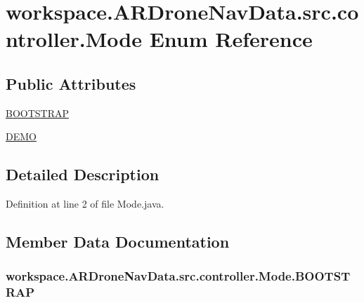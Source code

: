 \hypertarget{enumworkspace_1_1_a_r_drone_nav_data_1_1src_1_1controller_1_1_mode}{}\section{workspace.\+A\+R\+Drone\+Nav\+Data.\+src.\+controller.\+Mode Enum Reference}
\label{enumworkspace_1_1_a_r_drone_nav_data_1_1src_1_1controller_1_1_mode}
\subsection*{Public Attributes}
\begin{DoxyCompactItemize}
\item 
\hyperlink{enumworkspace_1_1_a_r_drone_nav_data_1_1src_1_1controller_1_1_mode_a2120c5fbe7850731f0921fa1523a0f67}{B\+O\+O\+T\+S\+T\+R\+A\+P}
\item 
\hyperlink{enumworkspace_1_1_a_r_drone_nav_data_1_1src_1_1controller_1_1_mode_a09071332c54725b55b8f88c41ec504d1}{D\+E\+M\+O}
\end{DoxyCompactItemize}


\subsection{Detailed Description}


Definition at line 2 of file Mode.\+java.



\subsection{Member Data Documentation}
\hypertarget{enumworkspace_1_1_a_r_drone_nav_data_1_1src_1_1controller_1_1_mode_a2120c5fbe7850731f0921fa1523a0f67}{}
\subsubsection[{B\+O\+O\+T\+S\+T\+R\+A\+P}]{\setlength{\rightskip}{0pt plus 5cm}workspace.\+A\+R\+Drone\+Nav\+Data.\+src.\+controller.\+Mode.\+B\+O\+O\+T\+S\+T\+R\+A\+P}\label{enumworkspace_1_1_a_r_drone_nav_data_1_1src_1_1controller_1_1_mode_a2120c5fbe7850731f0921fa1523a0f67}


